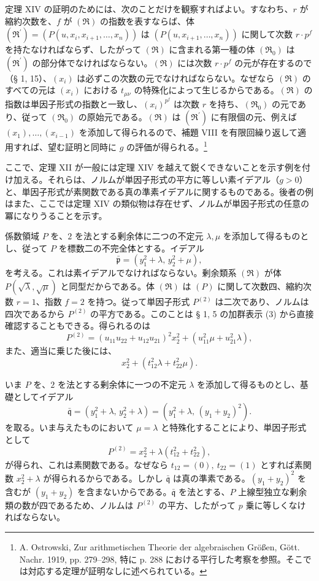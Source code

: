 \documentclass[11pt]{article}
\providecommand{\mR}{\mathfrak{R}}
\providecommand{\frakp}{\mathfrak p}
\providecommand{\frakq}{\mathfrak q}
\providecommand{\mR}{\mathfrak{R}}
\providecommand{\frakp}{\mathfrak p}
\providecommand{\frakq}{\mathfrak q}
\begin{document}
定理 XIV の証明のためには、次のことだけを観察すればよい。すなわち、$r$ が縮約次数を、$f$ が $(\mR)$ の指数を表すならば、体 $(\mR^{\prime})=(P(u,x_i,x_{i+1},\ldots,x_n))$ は $(P(u,x_{i+1},\ldots,x_n))$ に関して次数 $r\cdot p^f$ を持たなければならず、したがって $(\mR)$ に含まれる第一種の体 $(\mR_0)$ は $(\mR^{\prime})$ の部分体でなければならない。$(\mR)$ には次数 $r\cdot p^f$ の元が存在するので（§ 1, 15）、$(x_i)$ は必ずこの次数の元でなければならない。なぜなら $(\mR)$ のすべての元は $(x_i)$ における $t_{\mu\nu}$ の特殊化によって生じるからである。$(\mR)$ の指数は単因子形式の指数と一致し、$(x_i)^{p^f}$ は次数 $r$ を持ち、$(\mR_0)$ の元であり、従って $(\mR_0)$ の原始元である。$(\mR)$ は $(\mR^{\prime})$ に有限個の元、例えば $(x_1),\ldots,(x_{i-1})$ を添加して得られるので、補題 VIII を有限回繰り返して適用すれば、望む証明と同時に $g$ の評価が得られる。\footnote{A. Ostrowski, Zur arithmetischen Theorie der algebraischen Größen, Gött. Nachr. 1919, pp. 279--298, 特に p. 288 における平行した考察を参照。そこでは対応する定理が証明なしに述べられている。}

ここで、定理 XII が一般には定理 XIV を越えて鋭くできないことを示す例を付け加える。それらは、ノルムが単因子形式の平方に等しい素イデアル（$g>0$）と、単因子形式が素関数である真の準素イデアルに関するものである。後者の例はまた、ここでは定理 XIV の類似物は存在せず、ノルムが単因子形式の任意の冪になりうることを示す。

係数領域 $P$ を、$2$ を法とする剰余体に二つの不定元 $\lambda,\mu$ を添加して得るものとし、従って $P$ を標数二の不完全体とする。イデアル
\[
 \bar{\frakp}=(y_1^2+\lambda,\,y_2^2+\mu),
\]
を考える。これは素イデアルでなければならない。剰余類系 $(\mR)$ が体 $P(\sqrt\lambda,\sqrt\mu)$ と同型だからである。体 $(\mR)$ は $(P)$ に関して次数四、縮約次数 $r=1$、指数 $f=2$ を持つ。従って単因子形式 $P^{(2)}$ は二次であり、ノルムは四次であるから $P^{(2)}$ の平方である。このことは § 1, 5 の加群表示 (3) から直接確認することもできる。得られるのは
\[
 P^{(2)}=(u_{11}u_{22}+u_{12}u_{21})^2x_2^2+(u_{11}^2\mu+u_{21}^2\lambda),
\]
また、適当に乗じた後には、
\[
 x_2^2+(t_{12}^2\lambda+t_{22}^2\mu).
\]

いま $P$ を、$2$ を法とする剰余体に一つの不定元 $\lambda$ を添加して得るものとし、基礎としてイデアル
\[
 \bar{\frakq}=(y_1^2+\lambda,\,y_2^2+\lambda)=(y_1^2+\lambda,\,(y_1+y_2)^2).
\]
を取る。いま与えたものにおいて $\mu=\lambda$ と特殊化することにより、単因子形式として
\[
 P^{(2)}=x_2^2+\lambda(t_{12}^2+t_{22}^2),
\]
が得られ、これは素関数である。なぜなら $t_{12}=(0),\ t_{22}=(1)$ とすれば素関数 $x_2^2+\lambda$ が得られるからである。しかし $\bar{\frakq}$ は真の準素である。$(y_1+y_2)^2$ を含むが $(y_1+y_2)$ を含まないからである。$\bar{\frakq}$ を法とする、$P$ 上線型独立な剰余類の数が四であるため、ノルムは $P^{(2)}$ の平方、したがって $p$ 乗に等しくなければならない。
\end{document}
